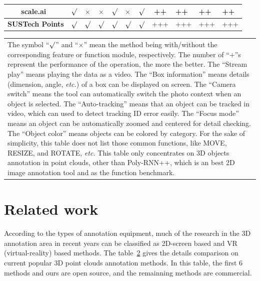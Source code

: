 \documentclass[letterpaper, 10 pt, conference]{ieeeconf}  %
\begin{document}
\begin{table}[ht]
{\begin{tabular}{c||c|c|c|p{1.5cm}<{\centering}|p{1.5cm}<{\centering}|c||c|p{2cm}<{\centering}|p{2cm}<{\centering}|p{2cm}<{\centering}}
		scale.ai~\cite{scale}       & $\surd$     &   $\times$ &   $\times$    &   $\surd$       &   $\times$    &  $\surd$    &     ++       &   ++     &   ++     &   ++     \\ \hline
		
		\textbf{SUSTech Points}            & $\surd$     &   $\surd$  &   $\surd$     &   $\surd$       &   $\surd$     &  $\surd$    &     +++      &  +++     &  +++     &  +++          \\ \hline \hline
	\end{tabular}
	}
	\begin{tabular}{p{17.5cm}}
		The symbol ``$\surd$'' and ``$\times$'' mean the method being with/without the corresponding feature or function module, respectively. The number of ``$\textbf{+}$''s represent the performance of the operation, the more the better. The ``Stream play'' means playing the data as a video. The ``Box information'' means details (dimension, angle, \textit{etc.}) of a box can be displayed on screen. The ``Camera switch''  means the  tool can automatically switch the photo context when an object is selected. The ``Auto-tracking'' means that an object can be tracked in video, which can used to detect tracking ID error easily. The ``Focus mode''  means an object can be automatically zoomed and centered for detail checking. The ``Object color''  means objects can be colored by category.  For the sake of simplicity, this table does not list those common functions, like MOVE, RESIZE, and ROTATE, \textit{etc.} This table only concentrates on 3D objects annotation in point clouds, other than Poly-RNN++, which is an best 2D image annotation tool and as the function benchmark.
	\end{tabular}
	\label{tab:annotationMethods}
	\vspace{-0.5cm}
\end{table}


\section{Related work}
\label{Realtedwork}
According to the types of annotation equipment, much of the research in the 3D annotation area in recent years can be classified as 2D-screen based and VR (virtual-reality) based methods. The table~\ref{tab:annotationMethods} gives the details comparison on current popular 3D point clouds annotation methods. In this table, the first 6 methods and ours are open source, and the remainning methods are commercial.
\end{document}
